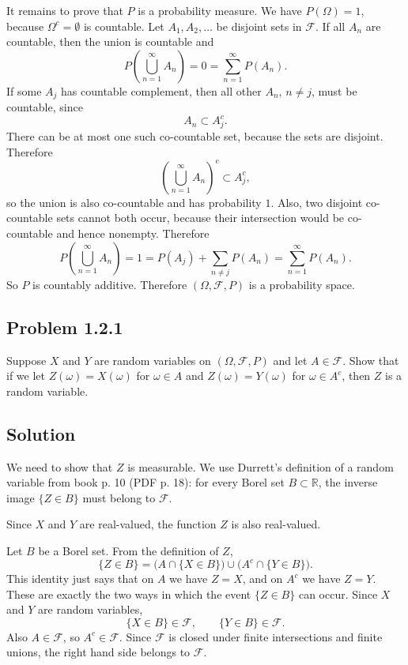 \documentclass[a4paper,12pt,openany]{article}
\theoremstyle{plain}
\theoremstyle{definition}
\begin{document}
\medskip

It remains to prove that $P$ is a probability measure. We have $P(\Omega)=1$, because $\Omega^c=\emptyset$ is countable. Let $A_1,A_2,\ldots$ be disjoint sets in $\mathcal{F}$. If all $A_n$ are countable, then the union is countable and
\[
P\left(\bigcup_{n=1}^{\infty} A_n\right)
=0
=\sum_{n=1}^{\infty} P(A_n).
\]
If some $A_j$ has countable complement, then all other $A_n$, $n\neq j$, must be countable, since
\[
A_n\subset A_j^c.
\]
There can be at most one such co-countable set, because the sets are disjoint. Therefore
\[
\left(\bigcup_{n=1}^{\infty}A_n\right)^c
\subset
A_j^c,
\]
so the union is also co-countable and has probability $1$. Also, two disjoint co-countable sets cannot both occur, because their intersection would be co-countable and hence nonempty. Therefore
\[
P\left(\bigcup_{n=1}^{\infty} A_n\right)
=1
=P(A_j)+\sum_{n\neq j}P(A_n)
=\sum_{n=1}^{\infty}P(A_n).
\]
So $P$ is countably additive. Therefore $(\Omega,\mathcal{F},P)$ is a probability space.

\subsection*{Problem 1.2.1}

Suppose $X$ and $Y$ are random variables on $(\Omega, \mathcal{F}, P)$ and let $A \in \mathcal{F}$. Show that if we let $Z(\omega) = X(\omega)$ for $\omega \in A$ and $Z(\omega) = Y(\omega)$ for $\omega \in A^c$, then $Z$ is a random variable.

\subsection*{Solution}

We need to show that $Z$ is measurable. We use Durrett's definition of a random variable from book p. 10 (PDF p. 18): for every Borel set $B\subset\mathbb{R}$, the inverse image $\{Z\in B\}$ must belong to $\mathcal{F}$.

Since $X$ and $Y$ are real-valued, the function $Z$ is also real-valued.

\medskip

Let $B$ be a Borel set. From the definition of $Z$,
\[
\{Z\in B\}
=
\bigl(A\cap\{X\in B\}\bigr)
\cup
\bigl(A^c\cap\{Y\in B\}\bigr).
\]
This identity just says that on $A$ we have $Z=X$, and on $A^c$ we have $Z=Y$. These are exactly the two ways in which the event $\{Z\in B\}$ can occur.
Since $X$ and $Y$ are random variables,
\[
\{X\in B\}\in\mathcal{F},
\qquad
\{Y\in B\}\in\mathcal{F}.
\]
Also $A\in\mathcal{F}$, so $A^c\in\mathcal{F}$. Since $\mathcal{F}$ is closed under finite intersections and finite unions, the right hand side belongs to $\mathcal{F}$.
\end{document}
